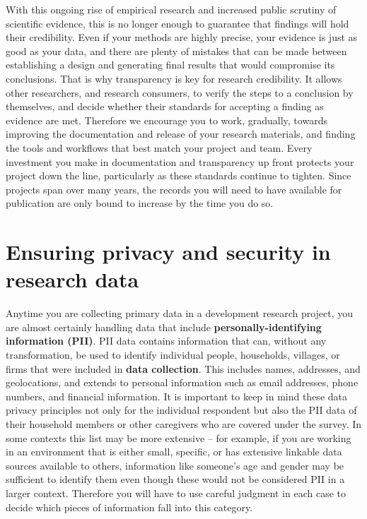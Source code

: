 With this ongoing rise of empirical research and increased public scrutiny of scientific evidence,
this is no longer enough to guarantee that findings will hold their credibility.
Even if your methods are highly precise,
your evidence is just as good as your data,
and there are plenty of mistakes that can be made between establishing a design and generating final results that would compromise its conclusions.
That is why transparency is key for research credibility.
It allows other researchers, and research consumers,
to verify the steps to a conclusion by themselves,
and decide whether their standards for accepting a finding as evidence are met.
Therefore we encourage you to work, gradually, towards improving
the documentation and release of your research materials,
and finding the tools and workflows that best match your project and team.
Every investment you make in documentation and transparency up front
protects your project down the line, particularly as these standards continue to tighten.
Since projects span over many years,
the records you will need to have available for publication are
only bound to increase by the time you do so.



\section{Ensuring privacy and security in research data}

Anytime you are collecting primary data in a development research project,
you are almost certainly handling data that include \textbf{personally-identifying information (PII)}.
PII data contains information that can, without any transformation, be used to identify
individual people, households, villages, or firms that were included in \textbf{data collection}.
This includes names, addresses, and geolocations, and extends to personal information
such as email addresses, phone numbers, and financial information.
It is important to keep in mind these data privacy principles not only for the individual respondent but also the PII data of their household members or other caregivers who are covered under the survey.
In some contexts this list may be more extensive --
for example, if you are working in an environment that is either small, specific,
or has extensive linkable data sources available to others,
information like someone's age and gender may be sufficient to identify them
even though these would not be considered PII in a larger context.
Therefore you will have to use careful judgment in each case
to decide which pieces of information fall into this category.

